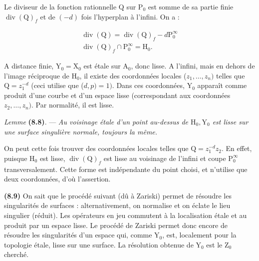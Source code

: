 \documentclass[10pt,leqno]{article}
\begin{document}
\noindent Le diviseur de la fonction rationnelle \(\mathrm{Q}\) sur \(\mathrm{P}_{0}\) est somme de sa partie finie \(\operatorname{div}(\mathrm{Q})_{f}\) et de \((-d)\) fois l'hyperplan à l'infini. On a :\par

\begin{equation*}\begin{gathered}\operatorname{div}(\mathrm{Q}) = \operatorname{div}(\mathrm{Q})_{f} - d\mathrm{P}_{0}^{\infty } \\ \operatorname{div}(\mathrm{Q})_{f} \cap  \mathrm{P}_{0}^{\infty } = \mathrm{H}_{0}.\end{gathered}\tag{8.7.1}\end{equation*}

\noindent \(\mathrm{A}\) distance finie, \(\mathrm{Y}_{0} = \mathrm{X}_{0}\) est étale sur \(\mathrm{A}_{0}\), donc lisse. \(\mathrm{A}\) l'infini, mais en dehors de l'image réciproque de \(\mathrm{H}_{0}\), il existe des coordonnées locales (\(z_{1},\ldots ,z_{n})\) telles que \(\mathrm{Q} = z_{1}^{-d}\) (ceci utilise que (\(d,p) = 1)\). Dans ces coordonnées, \(\mathrm{Y}_{0}\) apparaît comme produit d'une courbe et d'un espace lisse (correspondant aux coordonnées \(z_{2},\ldots ,z_{n})\). Par normalité, il est lisse.\par

\noindent \emph{Lemme} \textbf{(8.8)}. — {\itshape Au voisinage étale d'un point au-dessus de \(\mathrm{H}_{0}, \mathrm{Y}_{0}\) est lisse sur une surface singulière normale, toujours la même.}\par

\noindent On peut cette fois trouver des coordonnées locales telles que \(\mathrm{Q} = z_{1}^{-d}z_{2}\). En effet, puisque \(\mathrm{H}_{0}\) est lisse, \(\operatorname{div}(\mathrm{Q})_{f}\) est lisse au voisinage de l'infini et coupe \(\mathrm{P}_{0}^{\infty }\) transversalement. Cette forme est indépendante du point choisi, et n'utilise que deux coordonnées, d'où l'assertion.\par

\noindent \textbf{(8.9)} On sait que le procédé suivant (dû à Zariski) permet de résoudre les singularités de surfaces : alternativement, on normalise et on éclate le lieu singulier (réduit). Les opérateurs en jeu commutent à la localisation étale et au produit par un espace lisse. Le procédé de Zariski permet donc encore de résoudre les singularités d'un espace qui, comme \(\mathrm{Y}_{0}\), est, localement pour la topologie étale, lisse sur une surface. La résolution obtenue de \(\mathrm{Y}_{0}\) est le \(\mathrm{Z}_{0}\) cherché.\par
\end{document}
